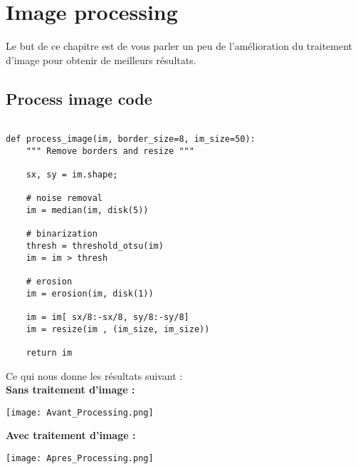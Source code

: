 
\chapter{Image processing} %

\label{Chapitre 4.1} %


Le but de ce chapitre est de vous parler un peu de l'amélioration du traitement d'image pour obtenir de meilleurs résultats.

\section{Process image code}


\begin{lstlisting}[frame=single,style=Python]  % Start your code-block

def process_image(im, border_size=8, im_size=50):
    """ Remove borders and resize """

    sx, sy = im.shape;

    # noise removal
    im = median(im, disk(5))

    # binarization
    thresh = threshold_otsu(im)
    im = im > thresh
    	  
    # erosion
    im = erosion(im, disk(1))

    im = im[ sx/8:-sx/8, sy/8:-sy/8]
    im = resize(im , (im_size, im_size))

    return im
\end{lstlisting}


\pagebreak
Ce qui nous donne les résultats suivant : \\


\textbf{Sans traitement d'image :}
\begin{center} 
\hspace{15cm}
\texttt{[image: Avant\_Processing.png]}
\end{center}
\vspace{0.5cm} 

\textbf{Avec traitement d'image :}
\begin{center} 
\hspace{15cm}
\texttt{[image: Apres\_Processing.png]}
\end{center}
\vspace{0.5cm} 

